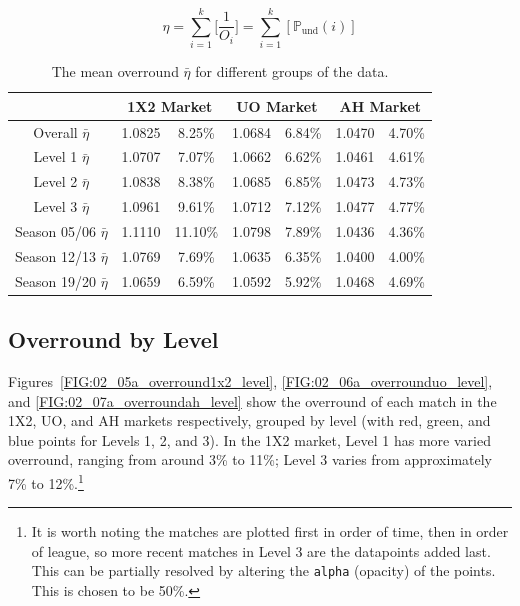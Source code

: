 \documentclass[a4paper,10pt]{report}
\begin{document}
\begin{equation}\label{eq:overround}
\eta = \sum^{k}_{i=1} \bigg[\frac{1}{O_i}\bigg] = \sum^{k}_{i=1}[\mathbb{P}_{\textrm{und}}(i)] 
\end{equation}

\begin{table}[h!]\begin{center}\begin{tabular}{c||cc|cc|cc}
	& \multicolumn{2}{|c|}{\textbf{1X2 Market}} & \multicolumn{2}{|c|}{\textbf{UO Market}} & \multicolumn{2}{|c}{\textbf{AH Market}}\\ \hline \hline
	Overall $\bar{\eta}$ 	& 1.0825 & 8.25\% & 1.0684 & 6.84\% & 1.0470 & 4.70\% \\ \hdashline
	Level 1 $\bar{\eta}$ 	& 1.0707 & 7.07\% & 1.0662 & 6.62\% & 1.0461 & 4.61\% \\
	Level 2 $\bar{\eta}$ 	& 1.0838 & 8.38\% & 1.0685 & 6.85\% & 1.0473 & 4.73\% \\
	Level 3 $\bar{\eta}$ 	& 1.0961 & 9.61\% & 1.0712 & 7.12\% & 1.0477 & 4.77\% \\ \hdashline
	Season 05/06 $\bar{\eta}$ & 1.1110 & 11.10\%& 1.0798 & 7.89\% & 1.0436 & 4.36\% \\
	Season 12/13 $\bar{\eta}$ & 1.0769 & 7.69\% & 1.0635 & 6.35\% & 1.0400 & 4.00\% \\
	Season 19/20 $\bar{\eta}$ & 1.0659 & 6.59\% & 1.0592 & 5.92\% & 1.0468 & 4.69\%
	\end{tabular}\end{center}\caption{The mean overround $\bar{\eta}$ for different groups of the data.}\label{tab:overround}\end{table}

\subsection*{Overround by Level}
Figures~\ref{FIG:02_05a_overround1x2_level}, \ref{FIG:02_06a_overrounduo_level}, and \ref{FIG:02_07a_overroundah_level} show the overround of each match in the 1X2, UO, and AH markets respectively, grouped by level (with red, green, and blue points for Levels 1, 2, and 3). In the 1X2 market, Level 1 has more varied overround, ranging from around 3\% to 11\%; Level 3 varies from approximately 7\% to 12\%.\footnote{It is worth noting the matches are plotted first in order of time, then in order of league, so more recent matches in Level 3 are the datapoints added last. This can be partially resolved by altering the \lstinline|alpha| (opacity) of the points. This is chosen to be 50\%.}\vspace{3mm}
\end{document}
